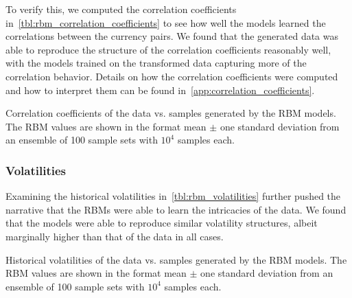 To verify this, we computed the correlation coefficients in~\cref{tbl:rbm_correlation_coefficients} to see how well the models learned the correlations between the currency pairs.
We found that the generated data was able to reproduce the structure of the correlation coefficients reasonably well, with the models trained on the transformed data capturing more of the correlation behavior.
Details on how the correlation coefficients were computed and how to interpret them can be found in~\cref{app:correlation_coefficients}.
\begin{table}[!htb]
    \centering
    \begin{adjustbox}{max width=\textwidth}
        
    \end{adjustbox}
    \caption{Correlation coefficients of the data vs. samples generated by the RBM models. The RBM values are shown in the format mean \(\pm\) one standard deviation from an ensemble of 100 sample sets with \( 10^4 \) samples each.}
    \label{tbl:rbm_correlation_coefficients}
\end{table}

\subsubsection{Volatilities}
Examining the historical volatilities in~\cref{tbl:rbm_volatilities} further pushed the narrative that the RBMs were able to learn the intricacies of the data.
We found that the models were able to reproduce similar volatility structures, albeit marginally higher than that of the data in all cases.
\begin{table}[!htb]
    \centering
    \begin{adjustbox}{max width=\textwidth}
        
    \end{adjustbox}
    \caption{Historical volatilities of the data vs. samples generated by the RBM models. The RBM values are shown in the format mean \(\pm\) one standard deviation from an ensemble of 100 sample sets with \( 10^4 \) samples each.}
    \label{tbl:rbm_volatilities}
\end{table}

